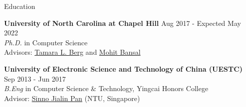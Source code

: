 \documentclass{resume} %
\begin{document}

\begin{rSection}{Education}

{\bf University of North Carolina at Chapel Hill} \hfill {Aug 2017  -  Expected May 2022} \\ 
{\sl Ph.D.} in Computer Science \\
Advisors: \href{http://www.tamaraberg.com/}{Tamara L. Berg} and \href{http://www.cs.unc.edu/~mbansal/}{Mohit Bansal}

{\bf University of Electronic Science and Technology of China (UESTC)} \hfill {Sep 2013 - Jun 2017} \\ 
{\sl B.Eng} in Computer Science \& Technology, Yingcai Honors College\\
Advisor: \href{https://personal.ntu.edu.sg/sinnopan/}{Sinno Jialin Pan} (NTU, Singapore)
\end{rSection}

\end{document}
